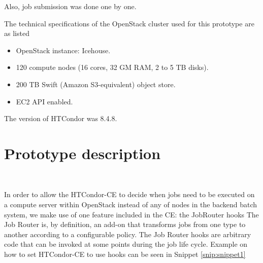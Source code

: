 \documentclass[a4paper]{jpconf}
\begin{document}
Also, job submission was done one by one.

The technical specifications of the OpenStack cluster used for this prototype are as listed 

\begin{itemize}
\item OpenStack instance: Icehouse.
\item 120 compute nodes (16 cores, 32 GM RAM, 2 to 5 TB disks).
\item 200 TB Swift (Amazon S3-equivalent) object store.
\item EC2 API enabled.
\end{itemize}

The version of HTCondor was 8.4.8.

\section{Prototype description}

~

In order to allow the HTCondor-CE to decide when jobs need to be executed on a
compute server within OpenStack instead of any of nodes in the backend batch
system, we make use of one feature included in the CE: the JobRouter hooks \cite{jobrouter} \newline
The Job Router is, by definition, an add-on that transforms jobs from one type to
another according to a configurable policy.
The Job Router hooks are arbitrary code that can be invoked at some points during the job life cycle.
Example on how to set HTCondor-CE to use hooks can be seen in Snippet \ref{snip:snippet1} 

\end{document}
